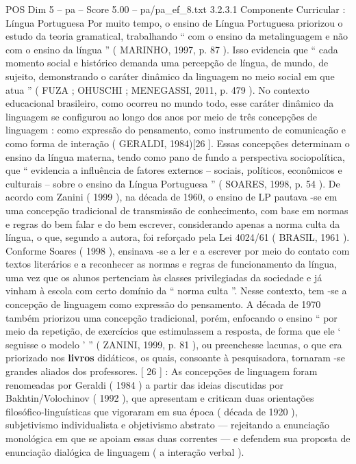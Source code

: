\begin{textsample}{POS Dim 5 – pa – Score 5.00 – pa/pa\_ef\_8.txt}  \label{ex:f5_pos_244}
3.2.3.1 Componente Curricular : Língua Portuguesa Por muito tempo, o ensino de Língua Portuguesa priorizou o estudo da teoria gramatical, trabalhando “ com o ensino da metalinguagem e não com o ensino da língua ” ( MARINHO, 1997, p. 87 ).
Isso evidencia que “ cada momento social e histórico demanda uma percepção de língua, de mundo, de sujeito, demonstrando o caráter dinâmico da linguagem no meio social em que atua ” ( FUZA ; OHUSCHI ; MENEGASSI, 2011, p. 479 ).
No contexto educacional brasileiro, como ocorreu no mundo todo, esse caráter dinâmico da linguagem se configurou ao longo dos anos por meio de três concepções de linguagem : como expressão do pensamento, como instrumento de comunicação e como forma de interação ( GERALDI, 1984)[26 ].
Essas concepções determinam o ensino da língua materna, tendo como pano de fundo a perspectiva sociopolítica, que “ evidencia a influência de fatores externos – sociais, políticos, econômicos e culturais – sobre o ensino da Língua Portuguesa ” ( SOARES, 1998, p. 54 ).
De acordo com Zanini ( 1999 ), na década de 1960, o ensino de LP pautava -se em uma concepção tradicional de transmissão de conhecimento, com base em normas e regras do bem falar e do bem escrever, considerando apenas a norma culta da língua, o que, segundo a autora, foi reforçado pela Lei 4024/61 ( BRASIL, 1961 ).
Conforme Soares ( 1998 ), ensinava -se a ler e a escrever por meio do contato com textos literários e a reconhecer as normas e regras de funcionamento da língua, uma vez que os alunos pertenciam às classes privilegiadas da sociedade e já vinham à escola com certo domínio da “ norma culta ”.
Nesse contexto, tem -se a concepção de linguagem como expressão do pensamento.
A década de 1970 também priorizou uma concepção tradicional, porém, enfocando o ensino “ por meio da repetição, de exercícios que estimulassem a resposta, de forma que ele ‘ seguisse o modelo ’ ” ( ZANINI, 1999, p. 81 ), ou preenchesse lacunas, o que era priorizado nos \textbf{livros} didáticos, os quais, consoante à pesquisadora, tornaram -se grandes aliados dos professores. [ 26 ] : As concepções de linguagem foram renomeadas por Geraldi ( 1984 ) a partir das ideias discutidas por Bakhtin/Volochinov ( 1992 ), que apresentam e criticam duas orientações filosófico-linguísticas que vigoraram em sua época ( década de 1920 ), subjetivismo individualista e objetivismo abstrato — rejeitando a enunciação monológica em que se apoiam essas duas correntes — e defendem sua proposta de enunciação dialógica de linguagem ( a interação verbal ).

\end{textsample}
